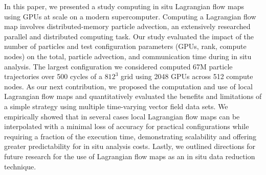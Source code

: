 In this paper, we presented a study computing in situ Lagrangian flow maps using GPUs at scale on a modern supercomputer.
%
Computing a Lagrangian flow map involves distributed-memory particle advection, an extensively researched parallel and distributed computing task.
%
Our study evaluated the impact of the number of particles and test configuration parameters (GPUs, rank, compute nodes) on the total, particle advection, and communication time during in situ analysis.
%
The largest configuration we considered computed 67M particle trajectories over 500 cycles of a $812^{3}$ grid using 2048 GPUs across 512 compute nodes.
%
As our next contribution, we proposed the computation and use of local Lagrangian flow maps and quantitatively evaluated the benefits and limitations of a simple strategy using multiple time-varying vector field data sets.
%
We empirically showed that in several cases local Lagrangian flow maps can be interpolated with a minimal loss of accuracy for practical configurations while requiring a fraction of the execution time, demonstrating scalability and offering greater predictability for in situ analysis costs.
%
Lastly, we outlined directions for future research for the use of Lagrangian flow maps as an in situ data reduction technique.
